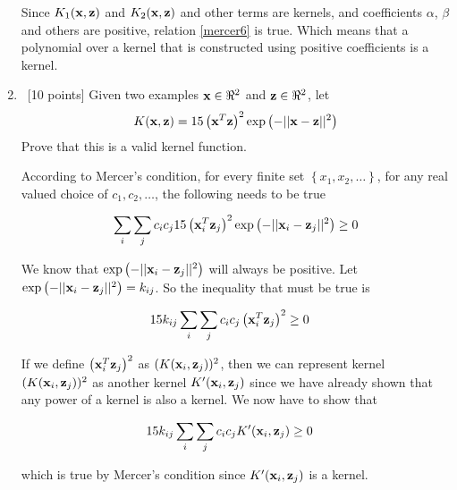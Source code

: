 \begin{enumerate}
Since $K_1({\bf x}, {\bf z})$ and $K_2({\bf x}, {\bf z})$ and other terms are kernels, and coefficients $\alpha$, $\beta$ and others are positive, relation \ref{mercer6} is true. Which means that a polynomial over a kernel that is constructed using positive coefficients is a kernel.

\item~[10 points] Given two examples ${\bf x} \in \Re^2$ and ${\bf z} \in
  \Re^2$, let
  \begin{equation}
    K({\bf x},{\bf z}) = 15\left({\bf x}^T{\bf z}\right)^2 \exp\left(-||{\bf x} - {\bf z}||^2\right)
  \end{equation}
  Prove that this is a valid kernel function.
  
According to Mercer's condition, for every finite set $\left \{ x_1, x_2, \ldots \right \}$, for any real valued choice of $c_1, c_2, \ldots$, the following needs to be true
  
  \begin{equation*}
\begin{aligned}
   \sum_i \sum_j c_i c_j 15\left({\bf x}_i^T{\bf z}_j\right)^2 \exp\left(-||{\bf x}_i - {\bf z}_j||^2\right) &\geq 0\\
\end{aligned}
\end{equation*}

We know that $\exp\left(-||{\bf x}_i - {\bf z}_j||^2\right)$ will always be positive. Let $\exp\left(-||{\bf x}_i - {\bf z}_j||^2\right) = k_{ij}$. So the inequality that must be true is

  \begin{equation*}
\begin{aligned}
  15k_{ij} \sum_i \sum_j c_i c_j \left({\bf x}_i^T{\bf z}_j\right)^2  &\geq 0
\end{aligned}
\end{equation*}
  
 If we define $\left({\bf x}_i^T{\bf z}_j\right)^2$ as $(K({\bf x}_i, {\bf z}_j))^2$, then we can represent kernel $(K({\bf x}_i, {\bf z}_j))^2$ as another kernel $K'({\bf x}_i, {\bf z}_j)$ since we have already shown that any power of a kernel is also a kernel. We now have to show that
 
   \begin{equation*}
\begin{aligned}
  15k_{ij} \sum_i \sum_j c_i c_j K'({\bf x}_i, {\bf z}_j)  &\geq 0
\end{aligned}
\end{equation*}
 
 which is true by Mercer's condition since $K'({\bf x}_i, {\bf z}_j)$ is a kernel.
 

\end{enumerate}
